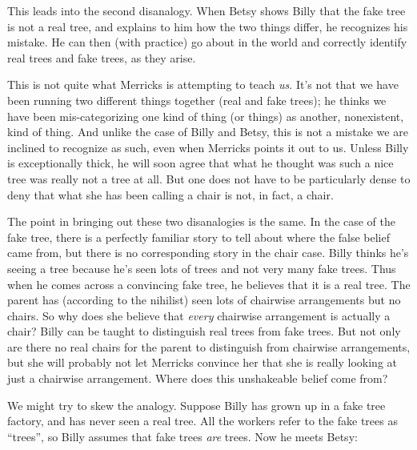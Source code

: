 \documentclass[11pt]{standalone} \newif\ifstandlone \standalonetrue
\begin{document}
\begin{spacing}{1.25}
This leads into the second disanalogy.  When Betsy shows Billy that
the fake tree is not a real tree, and explains to him how the two
things differ, he recognizes his mistake.  He can then (with practice)
go about in the world and correctly identify real trees and fake
trees, as they arise.

This is not quite what Merricks is attempting to teach {\em us}.  It's
not that we have been running two different things together (real and
fake trees); he thinks we have been mis-categorizing one kind of thing
(or things) as another, nonexistent, kind of thing.  And unlike the
case of Billy and Betsy, this is not a mistake we are inclined to
recognize as such, even when Merricks points it out to us.  Unless Billy
is exceptionally thick, he will soon agree that what he thought was
such a nice tree was really not a tree at all.  But one does not have
to be particularly dense to deny that what she has been calling a
chair is not, in fact, a chair.

The point in bringing out these two disanalogies is the same.  In the
case of the fake tree, there is a perfectly familiar story to tell
about where the false belief came from, but there is no corresponding
story in the chair case.  Billy thinks he's seeing a tree because he's
seen lots of trees and not very many fake trees.  Thus when he comes
across a convincing fake tree, he believes that it is a real tree.
The parent has (according to the nihilist) seen lots of chairwise
arrangements but no chairs.  So why does she believe that {\em every}
chairwise arrangement is actually a chair?  Billy can be taught to
distinguish real trees from fake trees.  But not only are there no
real chairs for the parent to distinguish from chairwise arrangements,
but she will probably not let Merricks convince her that she is really
looking at just a chairwise arrangement.  Where does this unshakeable
belief come from?

We might try to skew the analogy.  Suppose Billy has grown up in a
fake tree factory, and has never seen a real tree.  All the workers
refer to the fake trees as ``trees'', so Billy assumes that fake trees
{\em are} trees.  Now he meets Betsy:






\end{spacing}
\end{document}
